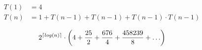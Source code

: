 \begin{frame}

\begin{align*}
T(1)&=4\\
T(n)&=1+T(n-1)+T(n-1)+T(n-1)\cdot T(n-1)
\end{align*}

$$2^{\lceil log(n)\rceil}\cdot\left(4+{25\over 2}+{676\over4}+{458239\over 8}+\ldots\right)$$

\end{frame}



